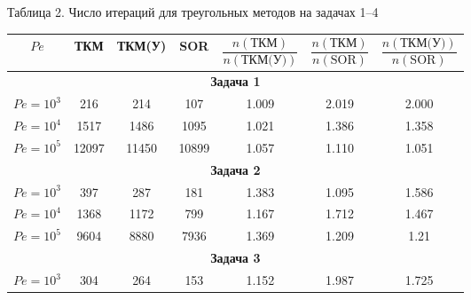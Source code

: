 \begin{center} 


Таблица 2. Число итераций для треугольных методов на задачах 1--4 


\medskip





\begin{tabular}{|c|c|c|c|c|c|c|} 


\hline 


$Pe$ & ТКМ & ТКМ(У) & SOR & $\dfrac{n(\text{ТКМ})}{n(\text{ТКМ(У)})}$ 


& $\dfrac{n(\text{ТКМ})}{n(\text{SOR})}$ 


& $\dfrac{n(\text{ТКМ(У)})}{n(\text{SOR})}$ \\


\hline 


\multicolumn{7}{|c|}{\bf Задача 1} \\ 


\hline 


$Pe=10^3$ & 216 & 214 & 107 & 1.009 & 2.019 & 2.000 \\ 


\hline 


$Pe=10^4$ & 1517 & 1486 & 1095 & 1.021 & 1.386 & 1.358 \\ 


\hline 


$Pe=10^5$ & 12097 & 11450 & 10899 & 1.057 & 1.110 & 1.051 \\ 


\hline 


\multicolumn{7}{|c|}{\bf Задача 2} \\ 


\hline 


$Pe=10^3$ & 397 & 287 & 181 & 1.383 & 1.095 & 1.586 \\ 


\hline 


$Pe=10^4$ & 1368 & 1172 & 799 & 1.167 & 1.712 & 1.467 \\ 


\hline 


$Pe=10^5$ & 9604 & 8880 & 7936 & 1.369 & 1.209 & 1.21 \\ 


\hline 


\multicolumn{7}{|c|}{\bf Задача 3} \\ 


\hline 


$Pe=10^3$ & 304 & 264 & 153 & 1.152 & 1.987 & 1.725 \\ 



\end{tabular}
\end{center}
